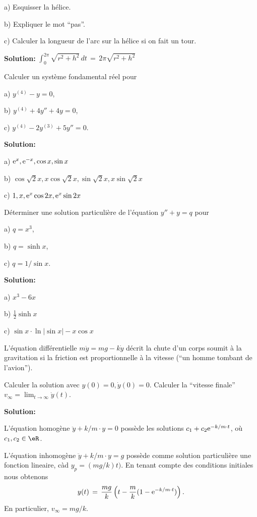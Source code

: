 \medskip
a)
Esquisser la hélice.

\medskip
b)
Expliquer le mot ``pas''.


\medskip
c)
Calculer la longueur de l'arc sur la hélice si on fait un tour.

\medskip
{\bf Solution:}
$\int_0^{2\pi} \sqrt{r^2+h^2} \,dt \,=\, 2 \pi \sqrt{r^2+h^2}$


\bigskip
\exerNico
Calculer un système fondamental réel pour

\medskip
a) $y^{(4)}-y = 0$,

\medskip
b) $y^{(4)} +4y'' +4y = 0$,

\medskip
c) $y^{(4)} -2y^{(3)} +5y'' = 0$.


\bigskip
{\bf Solution:}

\medskip
a) ${\rm e}^x, {\rm e}^{-x}, \cos x, \sin x$

\medskip
b) $\cos \sqrt{2} x, x \cos \sqrt{2}x, \sin \sqrt{2}x, x \sin \sqrt{2}x$

\medskip
c)
$1, x, {\rm e}^x \cos 2x, {\rm e}^x \sin 2x$



\bigskip
\exerNico
Déterminer une solution particulière de l'équation
$y''+y=q$ pour

\medskip
a) $q = x^3$,

\medskip
b) $q = \sinh x$,

\medskip
c) $q = 1/\sin x$.


\bigskip
{\bf Solution:}

\medskip
a) $x^3 - 6 x$

\medskip
b) $\frac 12 \sinh x$

\medskip
c) $\sin x \cdot \ln |\sin x| - x \cos x$


\bigskip
\exerNico
L'équation différentielle $m \ddot y = mg - k\dot y$
décrit la chute d'un corps soumit
à la gravitation si la friction est proportionnelle à la vitesse (``un homme tombant de l'avion'').

\medskip
Calculer la solution avec $y(0) =0, \dot y(0) = 0$.
Calculer la ``vitesse finale'' $v_\infty = \displaystyle \lim_{t \to \infty} \dot y (t)$.



\bigskip
{\bf Solution:}

\medskip
L'équation homogène $\ddot y + k/m \cdot y = 0$
possède les solutions $c_1+c_2 {\rm e}^{-k/m \cdot t}$,
où $c_1, c_2 \in \eR$.

L'équation inhomogène $\ddot y + k/m \cdot y = g$
possède comme solution particulière une fonction lineaire, càd
$y_p = (mg/k)t)$.
En tenant compte des conditions initiales nous obtenons
$$
	y(t) \,=\, \frac{mg}{k} \left( t-\frac mk (1-{\rm e}^{-k/m \cdot t})\right).
$$
En particulier, $v_\infty = mg/k$.






